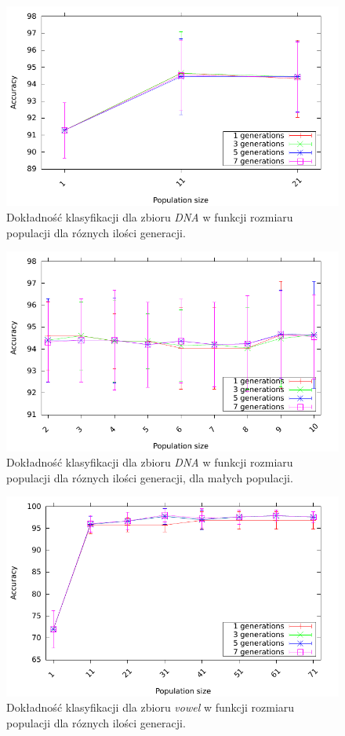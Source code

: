 \documentclass{article}
\begin{document}
		\begin{figure}[ht]
		\includegraphics[scale=0.90]{figures/accuracy-dna}
		\caption{Dokładność klasyfikacji dla zbioru \emph{DNA} w funkcji rozmiaru populacji dla róznych ilości generacji.\label{fig:acc-dna}}
	\end{figure}
	
		\begin{figure}[ht]
		\includegraphics[scale=0.90]{figures/accuracy-dna-detailed}
		\caption{Dokładność klasyfikacji dla zbioru \emph{DNA} w funkcji rozmiaru populacji dla róznych ilości generacji, dla małych populacji.\label{fig:acc-dna-detailed}}
	\end{figure}	
	

		\begin{figure}[ht]
		\includegraphics[scale=0.90]{figures/accuracy-vowel}
		\caption{Dokładność klasyfikacji dla zbioru \emph{vowel} w funkcji rozmiaru populacji dla róznych ilości generacji.\label{fig:acc-vowel}}
	\end{figure}
		
\end{document}
